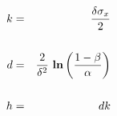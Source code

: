 \documentclass[12pt]{article}
\begin{document}
\pagestyle{empty}
\Large
{}
\pagecolor{ehandbook}

\boldmath
\begin{eqnarray*} 
  k & = & \frac{\delta \sigma_{x}}{2} \\
\hspace{.2in} \\
  d & = & \frac{2}{\delta^2}\mbox{ \bf ln} \left( \frac{1-\beta}{\alpha} \right) \\
\hspace{.2in} \\
  h & = & d k
\end{eqnarray*}
\end{document}
